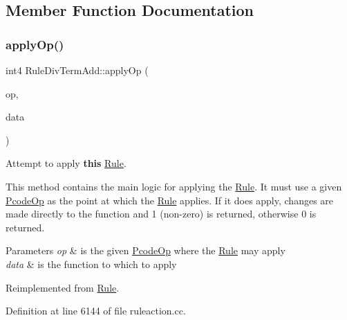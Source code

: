 \subsection{Member Function Documentation}
\mbox{\label{class_rule_div_term_add_ad39ae5dc8516af986340cd55e063afcc}} 
\subsubsection{\texorpdfstring{applyOp()}{applyOp()}}
{\footnotesize\ttfamily int4 Rule\+Div\+Term\+Add\+::apply\+Op (\begin{DoxyParamCaption}\item[{\mbox{\hyperlink{class_pcode_op}{Pcode\+Op}} $\ast$}]{op,  }\item[{\mbox{\hyperlink{class_funcdata}{Funcdata}} \&}]{data }\end{DoxyParamCaption})\hspace{0.3cm}{\ttfamily [virtual]}}



Attempt to apply {\bfseries{this}} \mbox{\hyperlink{class_rule}{Rule}}. 

This method contains the main logic for applying the \mbox{\hyperlink{class_rule}{Rule}}. It must use a given \mbox{\hyperlink{class_pcode_op}{Pcode\+Op}} as the point at which the \mbox{\hyperlink{class_rule}{Rule}} applies. If it does apply, changes are made directly to the function and 1 (non-\/zero) is returned, otherwise 0 is returned. 
\begin{DoxyParams}{Parameters}
{\em op} & is the given \mbox{\hyperlink{class_pcode_op}{Pcode\+Op}} where the \mbox{\hyperlink{class_rule}{Rule}} may apply \\
\hline
{\em data} & is the function to which to apply \\
\hline
\end{DoxyParams}


Reimplemented from \mbox{\hyperlink{class_rule_a4e3e61f066670175009f60fb9dc60848}{Rule}}.



Definition at line 6144 of file ruleaction.\+cc.

